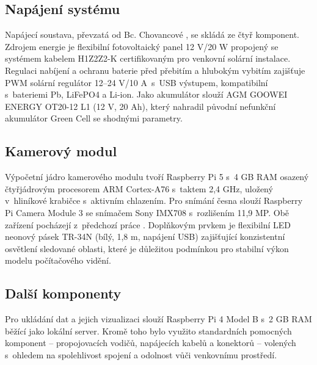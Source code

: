 \subsection*{Napájení systému}
Napájecí soustava, převzatá od Bc. Chovancové \cite{Chovancova2025}, se skládá ze čtyř komponent. Zdrojem energie je flexibilní fotovoltaický panel 12 V/20 W propojený se systémem kabelem H1Z2Z2-K certifikovaným pro venkovní solární instalace. Regulaci nabíjení a ochranu baterie před přebitím a hlubokým vybitím zajišťuje PWM solární regulátor 12--24 V/10 A~s~USB výstupem, kompatibilní s~bateriemi Pb, LiFePO4 a Li-ion. Jako akumulátor slouží AGM GOOWEI ENERGY OT20-12 L1 (12 V, 20 Ah), který nahradil původní nefunkční akumulátor Green Cell se shodnými parametry.

\subsection*{Kamerový modul}
Výpočetní jádro kamerového modulu tvoří Raspberry Pi 5 s~4 GB RAM osazený čtyřjádrovým procesorem ARM Cortex-A76 s~taktem 2,4 GHz, uložený v~hliníkové krabičce s~aktivním chlazením. Pro snímání česna slouží Raspberry Pi Camera Module 3 se snímačem Sony IMX708 s~rozlišením 11,9 MP. Obě zařízení pocházejí z~předchozí práce \cite{Chovancova2025}. Doplňkovým prvkem je flexibilní LED neonový pásek TR-34N (bílý, 1,8 m, napájení USB) zajišťující konzistentní osvětlení sledované oblasti, které je důležitou podmínkou pro stabilní výkon modelu počítačového vidění.

\subsection*{Další komponenty}
Pro ukládání dat a jejich vizualizaci slouží Raspberry Pi 4 Model B s~2 GB RAM běžící jako lokální server. Kromě toho bylo využito standardních pomocných komponent -- propojovacích vodičů, napájecích kabelů a konektorů -- volených s~ohledem na spolehlivost spojení a odolnost vůči venkovnímu prostředí.

\newpage
 
